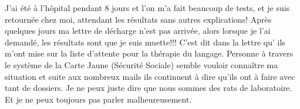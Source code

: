 J’ai été à l’hôpital pendant 8 jours et l’on m’a fait beaucoup de tests, et je
suis retournée chez moi, attendant les résultats sans autres explications! Après
quelques jours ma lettre de décharge n’est pas arrivée, alors lorsque je l’ai
demandé, les résultats sont que je suis muette!!! C’est dit dans la lettre qu’
ils m’ont mise sur la liste d’attente pour la thérapie du langage. Personne à
travers le système de la Carte Jaune (Sécurité Sociale) semble vouloir connaître
ma situation et suite aux nombreux mails ils continuent à dire qu’ils ont à
faire avec tant de dossiers. Je ne peux juste dire que nous sommes des rats de
laboratoire. Et je ne peux toujours pas parler malheureusement.


